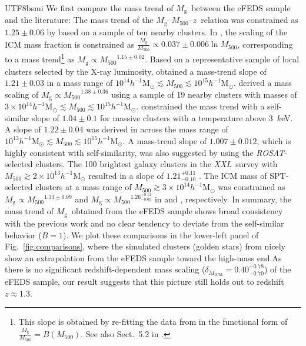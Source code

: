 \documentclass[longauth]{aa}
\newcommand{\Msunh}{\ensuremath{h^{-1}\mathrm{M}_{\odot}}}
\newcommand{\Mfiveoo}{\ensuremath{M_{500}}}
\newcommand{\redshift}{\ensuremath{z}}
\newcommand{\ROSAT}{\emph{ROSAT}}
\newcommand{\XXL}{\emph{XXL}}
\newcommand{\Mg}{\ensuremath{M_{\mathrm{g}}}}
\newcommand{\deltamg}{\ensuremath{\delta_{M_{\mathrm{ICM}}}}}
\newcommand{\ansdeltamg}{\ensuremath{ 0.40^{+0.78}_{-0.70} }}
\begin{document}
\begin{CJK*}{UTF8}{bsmi}
We first compare the mass trend of \Mg\ between the eFEDS sample and the literature:
The mass trend of the \Mg--\Mfiveoo--\redshift\ relation was constrained as $1.25\pm0.06$ by \cite{arnaud07} based on a sample of ten nearby clusters.
In \cite{vikhlinin09a}, the scaling of the ICM mass fraction is constrained as $\frac{\Mg}{\Mfiveoo}\propto{0.037\pm0.006\ln\Mfiveoo}$, corresponding to a mass trend\footnote{This slope is obtained by re-fitting the data from \cite{vikhlinin09a} in the functional form of $\frac{\Mg}{\Mfiveoo} = B \left(\Mfiveoo\right)$. See also Sect.~5.2 in \cite{chiu18a}.} as $\Mg\propto{\Mfiveoo}^{1.15\pm0.02}$.
Based on a representative sample of  local clusters selected by the X-ray luminosity, \cite{pratt09} obtained a mass-trend slope of $1.21\pm0.03$ in a mass range of $10^{14}\Msunh \lesssim \Mfiveoo \lesssim 10^{15}\Msunh$.
\cite{zhang12} derived a mass scaling of $\Mg\propto {\Mfiveoo}^{1.38\pm0.36}$ using a sample of 19 nearby clusters with masses of $3\times10^{14}\Msunh \lesssim \Mfiveoo \lesssim 10^{15}\Msunh$.
\cite{mahdavi13} constrained the mass trend with a self-similar slope of $1.04\pm0.1$ for massive clusters with a temperature above $3$~$k$eV.
A slope of $1.22\pm0.04$ was derived in \cite{lovisari15} across the mass range of $10^{13}\Msunh\lesssim\Mfiveoo\lesssim10^{15}\Msunh$.
A mass-trend slope of $1.007\pm0.012$, which is highly consistent with self-similarity, was also suggested by \cite{mantz16b} using the \ROSAT-selected clusters.
The 100 brightest galaxy clusters in the \XXL\ survey with $\Mfiveoo\gtrsim2\times10^{13}\Msunh$ resulted in a slope of $1.21^{+0.11}_{-0.10}$ \citep{eckert16}.
The ICM mass of SPT-selected clusters at a mass range of $\Mfiveoo\gtrsim3\times{10}^{14}\Msunh$ was constrained as $\Mg\propto{\Mfiveoo}^{1.33\pm0.09}$ and $\Mg\propto {\Mfiveoo}^{1.26^{+0.12}_{-0.09}}$ in \cite{chiu18a} and \cite{bulbul19}, respectively.
In summary, the mass trend of \Mg\ obtained from the eFEDS sample shows broad consistency with the previous work and no clear tendency to deviate from the self-similar behavior ($B = 1$). 
We plot these comparisons in the lower-left panel of Fig.~\ref{fig:comparisons}, where the simulated clusters (golden stars) from \cite{barnes17} nicely show an extrapolation from the eFEDS sample toward the high-mass end.As there is no significant redshift-dependent mass scaling ($\deltamg = \ansdeltamg$) of the eFEDS sample, our result suggests that this picture still holds out to redshift $\redshift\approx1.3$. 



\end{CJK*}
\end{document}
